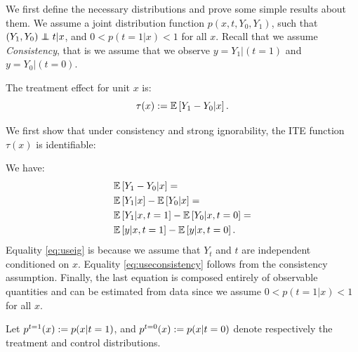We first define the necessary distributions and prove some simple results about them. We assume a joint distribution function $p(x,t,Y_0,Y_1)$, such that $(Y_1, Y_0)\indep t | x $, and $0<p(t=1|x)<1$ for all $x$. 
Recall that we assume \emph{Consistency}, that is we assume that we observe $y=Y_1|(t=1)$ and $y=Y_0|(t=0)$.

\begin{thmappdef}\label{def:teA}
The treatment effect for unit $x$ is:
$$\tau(x) := \mathbb{E}\left[Y_1 - Y_0 | x \right].$$
\end{thmappdef}

We first show that under consistency and strong ignorability, the ITE function $\tau(x)$ is identifiable:
\begin{thmapplem}
We have:
\begin{align}
&\mathbb{E}\left[Y_1-Y_0|x\right] =\nonumber \\
&\mathbb{E}\left[Y_1 |x\right]-\mathbb{E}\left[Y_0|x\right] =  \label{eq:useig}\\
&\mathbb{E}\left[Y_1|x,t=1\right]-\mathbb{E}\left[Y_0|x, t=0\right] = \label{eq:useconsistency}\\
&\mathbb{E}\left[y|x,t=1\right]-\mathbb{E}\left[y|x, t=0\right] .\nonumber 
\end{align}
Equality \eqref{eq:useig} is because we assume that $Y_t$ and $t$ are independent conditioned on $x$.
Equality \eqref{eq:useconsistency} follows from the consistency assumption.
Finally, the last equation is composed entirely of observable quantities and can be estimated from data since we assume $0<p(t=1|x)<1$ for all $x$.
\end{thmapplem}



\begin{thmappdef}
Let $p^{t=1}(x) := p(x|t=1)$, and $p^{t=0}(x) := p(x|t=0)$ denote respectively the treatment and control distributions.
\end{thmappdef}



